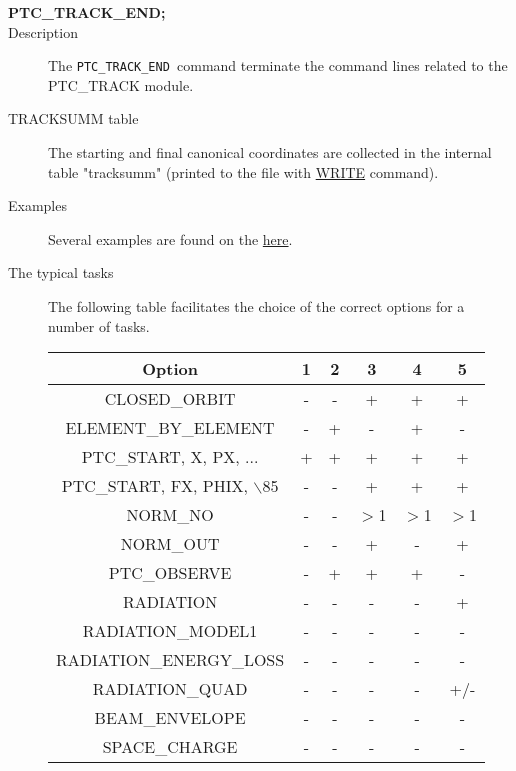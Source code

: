 \begin{description}
	\item[\textbf{PTC\_TRACK\_END;}] 

	\item[Description] The \texttt{PTC\_TRACK\_END }command terminate 
     the command lines related to the PTC\_TRACK module.
\end{description}
\begin{description}
	\item[TRACKSUMM table] 
The starting and final 
     canonical coordinates are collected in the internal table "tracksumm" (printed to the file with
     \href{../control/general.html#write}{WRITE} 
   command).
\end{description}
\begin{description}
	\item[Examples] Several examples are found on the
       \href{http://cern.ch/frs/mad-X_examples/ptc_track}{
    here}.
	\item[The typical tasks ] 
 The following table 
  facilitates the choice of the correct options for a number of tasks.
    
\begin{tabular}{cccccc}
\hline 
\textbf{Option} & \textbf{1} & \textbf{2} & \textbf{3} & \textbf{4} & \textbf{5 } \\ 
\hline
CLOSED\_ORBIT & - & - & + & + & + \\ 
\hline
ELEMENT\_BY\_ELEMENT & - & + & - & + & - \\ 
\hline
PTC\_START, X, PX, ... & + & + & + & + & + \\ 
\hline
PTC\_START, FX, PHIX, $\backslash$85 & -  & - & + & + & + \\ 
\hline
NORM\_NO & - & - & $>$1 & $>$1 & $>$1 \\ 
\hline
NORM\_OUT & - & - & + & - & + \\ 
\hline
PTC\_OBSERVE & - & + & + & + & - \\ 
\hline
RADIATION & - & - & - & - & + \\ 
\hline
RADIATION\_MODEL1 & - & - & - & - & - \\ 
\hline
RADIATION\_ENERGY\_LOSS & - & - & - & - & - \\ 
\hline
RADIATION\_QUAD & - & - & - & - & +/- \\ 
\hline
BEAM\_ENVELOPE & - & - & - & - & - \\ 
\hline
SPACE\_CHARGE & - & - & - & - & - \\ 
\hline


\end{tabular}
\end{description}
